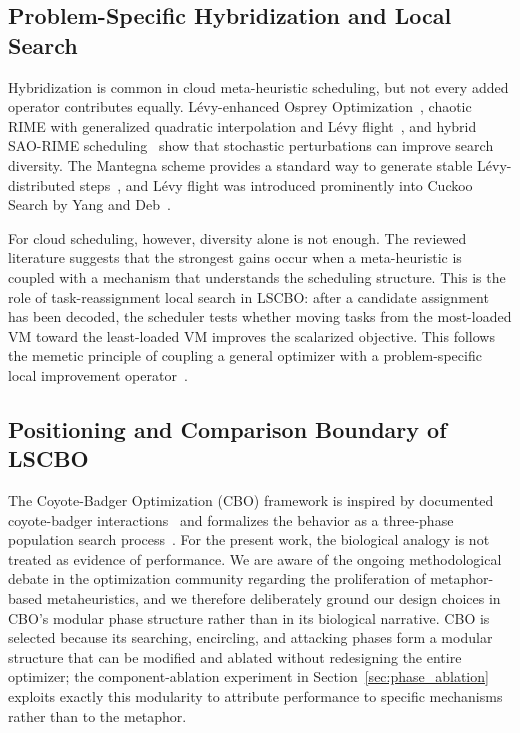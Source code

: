 \documentclass[pdflatex,onecolumn,sn-mathphys-num]{sn-jnl}
\begin{document}
\subsection{Problem-Specific Hybridization and Local Search}
Hybridization is common in cloud meta-heuristic scheduling, but not every added operator contributes equally. L\'{e}vy-enhanced Osprey Optimization~\cite{Dehghani2023,Chintale2024}, chaotic RIME with generalized quadratic interpolation and L\'{e}vy flight~\cite{Sabipour2025}, and hybrid SAO-RIME scheduling~\cite{Zhu2025} show that stochastic perturbations can improve search diversity. The Mantegna scheme provides a standard way to generate stable L\'{e}vy-distributed steps~\cite{Mantegna1994}, and L\'{e}vy flight was introduced prominently into Cuckoo Search by Yang and Deb~\cite{Yang2009}.

For cloud scheduling, however, diversity alone is not enough. The reviewed literature suggests that the strongest gains occur when a meta-heuristic is coupled with a mechanism that understands the scheduling structure. This is the role of task-reassignment local search in LSCBO: after a candidate assignment has been decoded, the scheduler tests whether moving tasks from the most-loaded VM toward the least-loaded VM improves the scalarized objective. This follows the memetic principle of coupling a general optimizer with a problem-specific local improvement operator~\cite{Moscato1989}.

\subsection{Positioning and Comparison Boundary of LSCBO}
The Coyote-Badger Optimization (CBO) framework is inspired by documented coyote-badger interactions~\cite{Kiliaan1991} and formalizes the behavior as a three-phase population search process~\cite{Khatab2025}. For the present work, the biological analogy is not treated as evidence of performance. We are aware of the ongoing methodological debate in the optimization community regarding the proliferation of metaphor-based metaheuristics, and we therefore deliberately ground our design choices in CBO's modular phase structure rather than in its biological narrative. CBO is selected because its searching, encircling, and attacking phases form a modular structure that can be modified and ablated without redesigning the entire optimizer; the component-ablation experiment in Section~\ref{sec:phase_ablation} exploits exactly this modularity to attribute performance to specific mechanisms rather than to the metaphor.
\end{document}
